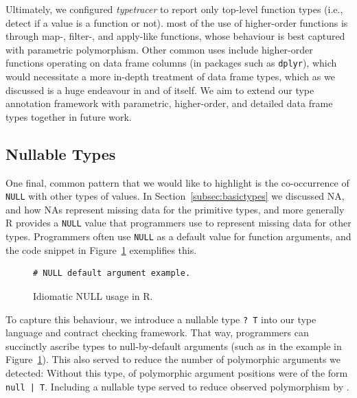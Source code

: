 \documentclass[acmsmall,review,anonymous]{acmart}\settopmatter{printfolios=true,printccs=false,printacmref=false}
\newcommand{\code}[1]{{\lstinline[style=Rin]!#1!}\xspace}
\newcommand{\typetracer}{\emph{typetracer}\xspace} %
\begin{document}
Ultimately, we configured \typetracer to report only top-level function
types (i.e., detect if a value is a function or not).   most of the use of higher-order functions is through map-, filter-,
and apply-like functions, whose behaviour is best captured with parametric
polymorphism.  Other common uses include higher-order functions operating on
data frame columns (in packages such as \code{dplyr}), which would
necessitate a more in-depth treatment of data frame types, which as we
discussed is a huge endeavour in and of itself.  We aim to extend our type
annotation framework with parametric, higher-order, and detailed data frame
types together in future work.


%
%
%
%
\subsection{Nullable Types}

One final, common pattern that we would like to highlight is the
co-occurrence of \code{NULL} with other types of values.  In
Section~\ref{subsec:basictypes} we discussed NA, and how NAs represent
missing data for the primitive types, and more generally R provides a
\code{NULL} value that programmers use to represent missing data for other
types.  Programmers often use \code{NULL} as a default value for function
arguments, and the code snippet in Figure~\ref{fig:null} exemplifies this.

\begin{figure}[htbp]
\begin{center}

\begin{lstlisting}
# NULL default argument example. 
\end{lstlisting}

\caption{Idiomatic NULL usage in R.}
\label{fig:null}
\end{center}
\end{figure}

To capture this behaviour, we introduce a nullable type \code{? T} into our
type language and contract checking framework.  That way, programmers can
succinctly ascribe types to null-by-default arguments (such as in the
example in Figure~\ref{fig:null}).  This also served to reduce the number of
polymorphic arguments we detected: Without this type,  of
polymorphic argument positions were of the form \code{null | T}.  Including
a nullable type served to reduce observed polymorphism by .
\end{document}
